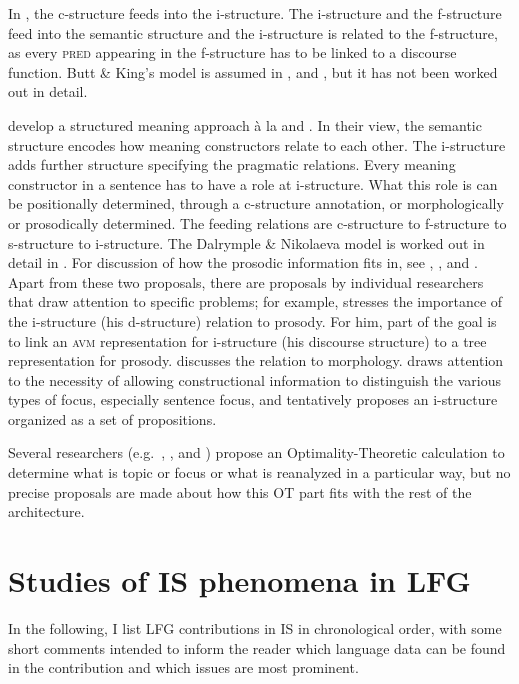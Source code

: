 \documentclass[output=paper,hidelinks]{langscibook}
\begin{document}
In \citet{BK96,BK00}, the c-structure feeds into the i-structure. The i-structure and the f-structure feed into the semantic structure and the i-structure is related to the f-structure,  as every \textsc{pred} appearing in the f-structure has to be linked to a discourse function. Butt \& King's model is assumed in \citet{Sulger09}, \citet{Dione12} and \citet{A07},  but it has not been worked out in detail. 

\citet{DN} develop a structured meaning approach à la \citet{vonStechow} and \citet{Krifka06}. In their view, the semantic structure encodes how meaning constructors relate to each other. The i-structure adds further structure specifying the pragmatic relations. Every meaning constructor in a sentence has to have a role at i-structure. What this role is can be positionally determined, through a c-structure annotation, or morphologically or prosodically determined. The feeding relations are c-structure to f-structure to s-structure to i-structure. The Dalrymple \& Nikolaeva model is worked out in detail in \citet{DLM:LFG}. For discussion of how the prosodic information fits in, see \citet{DM11}, \citet{MycockLowe2013}, \citet{Mycock2013} and . 
Apart from these two proposals, there are proposals by individual researchers that draw attention to specific problems; for example, \citet{Connor2006} stresses the importance of the i-structure (his d-structure) relation to prosody.  For him, part of the goal is to link an \textsc{avm} representation for i-structure (his discourse structure) to a tree representation for prosody.  \citet{Otoguro03} discusses the relation to morphology. \citet{Dalstrom03} draws attention to the necessity of allowing constructional information to distinguish the various types of focus, especially sentence focus, and tentatively proposes an i-structure organized as a set of propositions. 

Several researchers (e.g.\ \citealt{Connor2006}, \citealt{Choi1996}, and \citealt{A10}) propose an Optimality-Theoretic calculation to determine what is topic or focus or what is reanalyzed in a particular way, but no precise proposals are made about how this OT part fits with the rest of the architecture. 

\section{Studies of IS phenomena in LFG}\label{sec:IS:studies}
 
 In the following, I list LFG contributions in IS in chronological order, with some short comments intended to inform the reader which language data can be found in the contribution and which issues are most prominent.
 
\end{document}
